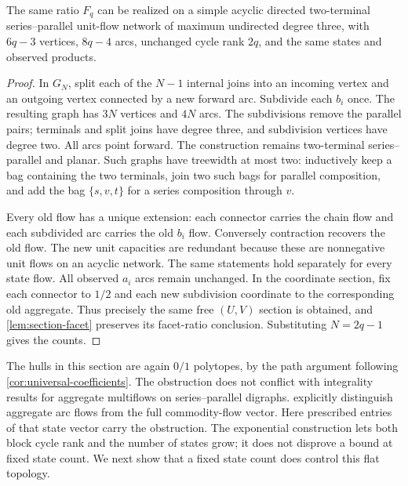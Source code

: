 \begin{corollary}\label{cor:fibonacci-simple}
The same ratio $F_q$ can be realized on a simple acyclic directed
two-terminal series--parallel unit-flow network of maximum undirected
degree three, with $6q-3$ vertices, $8q-4$ arcs, unchanged cycle
rank $2q$, and the same states and observed products.
\end{corollary}
\begin{proof}
In $G_N$, split each of the $N-1$ internal joins into an incoming
vertex and an outgoing vertex connected by a new forward arc.
Subdivide each $b_i$ once. The resulting graph has $3N$ vertices
and $4N$ arcs. The subdivisions remove the parallel pairs; terminals
and split joins have degree three, and subdivision vertices have
degree two. All arcs point forward. The construction remains
two-terminal series--parallel and planar. Such graphs have treewidth
at most two: inductively keep a bag containing the two terminals,
join two such bags for parallel composition, and add the bag
$\{s,v,t\}$ for a series composition through $v$.

Every old flow has a unique extension: each connector carries the
chain flow and each subdivided arc carries the old $b_i$ flow.
Conversely contraction recovers the old flow. The new unit capacities
are redundant because these are nonnegative unit flows on an acyclic
network. The same statements hold separately for every state flow.
All observed $a_i$ arcs remain unchanged. In the coordinate section,
fix each connector to $1/2$ and each new subdivision coordinate to
the corresponding old aggregate. Thus precisely the same free
$(U,V)$ section is obtained, and \cref{lem:section-facet} preserves
its facet-ratio conclusion. Substituting $N=2q-1$ gives the counts.
\end{proof}

The hulls in this section are again $0/1$ polytopes, by the path
argument following \cref{cor:universal-coefficients}. The obstruction
does not conflict with integrality results for aggregate multiflows
on series--parallel digraphs. \citet[Remark~1]{AlmoghrabiSkutellaWarode2026}
explicitly distinguish aggregate arc flows from the full commodity-flow
vector. Here prescribed entries of that state vector carry the
obstruction. The exponential construction lets both block cycle rank
and the number of states grow; it does not disprove a bound at fixed
state count. We next show that a fixed state count does control this
flat topology.
